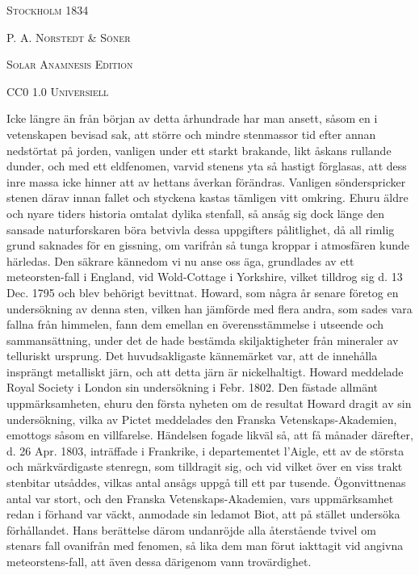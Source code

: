 \documentclass[a4paper, 12pt, oneside, swedish]{article}
\begin{document}
\begin{titlepage}
	\vspace*{\fill}%
	
	{\scshape Stockholm 1834} %
	
	{\scshape\footnotesize P. A. Norstedt \& Söner} %

	\vspace{1\baselineskip} %

    {\scshape Solar Anamnesis Edition}  %
	
	{\scshape\small CC0 1.0 Universiell } %
\end{titlepage}
\setlength{\parskip}{1mm plus1mm minus1mm}
\clearpage
\tableofcontents
\clearpage
Icke längre än från början av detta århundrade har man ansett, såsom en i vetenskapen bevisad sak, att större och mindre stenmassor tid efter annan nedstörtat på jorden, vanligen under ett starkt brakande, likt åskans rullande dunder, och med ett eldfenomen, varvid stenens yta så hastigt förglasas, att dess inre massa icke hinner att av hettans åverkan förändras. Vanligen sönderspricker stenen därav innan fallet och styckena kastas tämligen vitt omkring. Ehuru äldre och nyare tiders historia omtalat dylika stenfall, så ansåg sig dock länge den sansade naturforskaren böra betvivla dessa uppgifters pålitlighet, då all rimlig grund saknades för en gissning, om varifrån så tunga kroppar i atmosfären kunde härledas. Den säkrare kännedom vi nu anse oss äga, grundlades av ett meteorsten-fall i England, vid Wold-Cottage i Yorkshire, vilket tilldrog sig d. 13 Dec. 1795 och blev behörigt bevittnat. Howard, som några år senare företog en undersökning av denna sten, vilken han jämförde med flera andra, som sades vara fallna från himmelen, fann dem emellan en överensstämmelse i utseende och sammansättning, under det de hade bestämda skiljaktigheter från mineraler av telluriskt ursprung. Det huvudsakligaste kännemärket var, att de innehålla insprängt metalliskt järn, och att detta järn är nickelhaltigt. Howard meddelade Royal Society i London sin undersökning i Febr. 1802. Den fästade allmänt uppmärksamheten, ehuru den första nyheten om de resultat Howard dragit av sin undersökning, vilka av Pictet meddelades den Franska Vetenskaps-Akademien, emottogs såsom en villfarelse. Händelsen fogade likväl så, att få månader därefter, d. 26 Apr. 1803, inträffade i Frankrike, i departementet l'Aigle, ett av de största och märkvärdigaste stenregn, som tilldragit sig, och vid vilket över en viss trakt stenbitar utsåddes, vilkas antal ansågs uppgå till ett par tusende. Ögonvittnenas antal var stort, och den Franska Vetenskaps-Akademien, vars uppmärksamhet redan i förhand var väckt, anmodade sin ledamot Biot, att på stället undersöka förhållandet. Hans berättelse därom undanröjde alla återstående tvivel om stenars fall ovanifrån med fenomen, så lika dem man förut iakttagit vid angivna meteorstens-fall, att även dessa därigenom vann trovärdighet.
\end{document}
